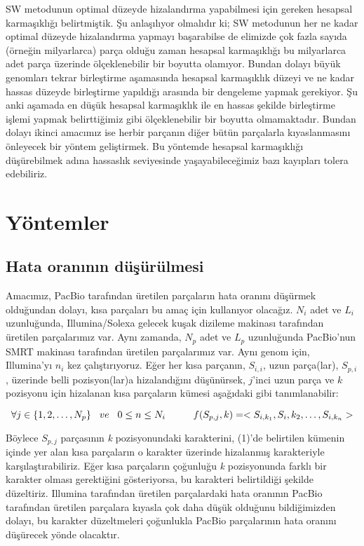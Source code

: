SW metodunun optimal düzeyde hizalandırma yapabilmesi için gereken hesapsal karmaşıklığı belirtmiştik. Şu anlaşılıyor olmalıdır ki; SW metodunun her ne kadar optimal düzeyde hizalandırma yapmayı başarabilse de elimizde çok fazla sayıda (örneğin milyarlarca) parça olduğu zaman hesapsal karmaşıklığı bu milyarlarca adet parça üzerinde ölçeklenebilir bir boyutta olamıyor. Bundan dolayı büyük genomları tekrar birleştirme aşamasında hesapsal karmaşıklık düzeyi ve ne kadar hassas düzeyde birleştirme yapıldığı arasında bir dengeleme yapmak gerekiyor. Şu anki aşamada en düşük hesapsal karmaşıklık ile en hassas şekilde birleştirme işlemi yapmak belirttiğimiz gibi ölçeklenebilir bir boyutta olmamaktadır. Bundan dolayı ikinci amacımız ise herbir parçanın diğer bütün parçalarla kıyaslanmasını önleyecek bir yöntem geliştirmek. Bu yöntemde hesapsal karmaşıklığı düşürebilmek adına hassaslık seviyesinde yaşayabileceğimiz bazı kayıpları tolera edebiliriz.

\section{Yöntemler}
\subsection{Hata oranının düşürülmesi}
Amacımız, PacBio tarafından üretilen parçaların hata oranını düşürmek olduğundan dolayı, kısa parçaları bu amaç için kullanıyor olacağız. $N_i$ adet ve $L_i$ uzunluğunda, Illumina/Solexa gelecek kuşak dizileme makinası tarafından üretilen parçalarımız var. Aynı zamanda, $N_p$ adet ve $L_p$ uzunluğunda PacBio'nun SMRT makinası tarafından üretilen parçalarımız var. Aynı genom için, Illumina'yı $n_i$ kez çalıştırıyoruz. Eğer her kısa parçanın, $S_{i,i}$, uzun parça(lar), $S_{p,i}$, üzerinde belli pozisyon(lar)a hizalandığını düşünürsek, $j$'inci uzun parça ve $k$ pozisyonu için hizalanan kısa parçaların kümesi aşağıdaki gibi tanımlanabilir:

\begin{equation} \label{eq1}
\forall j \in \{1,2, \dots, N_p\} \hspace{0.3cm} ve \hspace{0.3cm}  0 \leq n \leq N_i \hspace{1cm}  f(S_{p,j}, k) = < S_{i,k_1},  S_i,k_2 , \dots, S_{i,k_n} >
\end{equation}

Böylece $S_{p,j}$ parçasının \textit{k} pozisyonundaki karakterini, (1)'de belirtilen kümenin içinde yer alan kısa parçaların o karakter üzerinde hizalanmış karakteriyle karşılaştırabiliriz. Eğer kısa parçaların çoğunluğu \textit{k} pozisyonunda farklı bir karakter olması gerektiğini gösteriyorsa, bu karakteri belirtildiği şekilde düzeltiriz. Illumina tarafından üretilen parçalardaki hata oranının PacBio tarafından üretilen parçalara kıyasla çok daha düşük olduğunu bildiğimizden dolayı, bu karakter düzeltmeleri çoğunlukla PacBio parçalarının hata oranını düşürecek yönde olacaktır.


